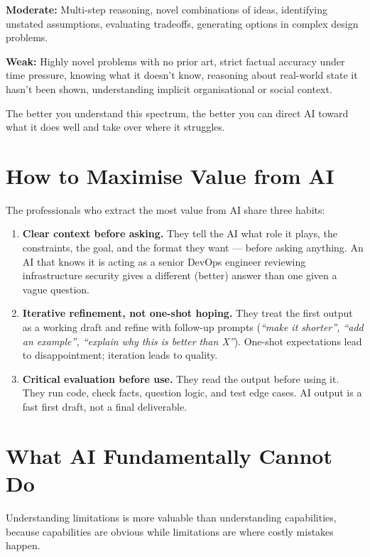 \textbf{Moderate:} Multi-step reasoning, novel combinations of ideas, identifying
unstated assumptions, evaluating tradeoffs, generating options in complex design
problems.

\textbf{Weak:} Highly novel problems with no prior art, strict factual accuracy under
time pressure, knowing what it doesn't know, reasoning about real-world state it hasn't
been shown, understanding implicit organisational or social context.

The better you understand this spectrum, the better you can direct AI toward what it
does well and take over where it struggles.

\section{How to Maximise Value from AI}
\label{sec:maximise}

The professionals who extract the most value from AI share three habits:

\begin{enumerate}
  \item \textbf{Clear context before asking.}
    They tell the AI what role it plays, the constraints, the goal, and the format they
    want --- before asking anything. An AI that knows it is acting as a senior DevOps
    engineer reviewing infrastructure security gives a different (better) answer than one
    given a vague question.

  \item \textbf{Iterative refinement, not one-shot hoping.}
    They treat the first output as a working draft and refine with follow-up prompts
    (\textit{``make it shorter'', ``add an example'', ``explain why this is better than X''}).
    One-shot expectations lead to disappointment; iteration leads to quality.

  \item \textbf{Critical evaluation before use.}
    They read the output before using it. They run code, check facts, question logic,
    and test edge cases. AI output is a fast first draft, not a final deliverable.
\end{enumerate}

\section{What AI Fundamentally Cannot Do}
\label{sec:limitations}

Understanding limitations is more valuable than understanding capabilities, because
capabilities are obvious while limitations are where costly mistakes happen.

